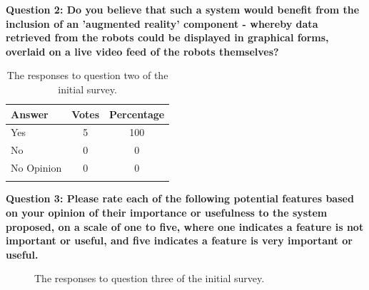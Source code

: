 \clearpage
\noindent\textbf{Question 2: Do you believe that such a system would benefit from the inclusion of an 'augmented reality' component - whereby data retrieved from the robots could be displayed in graphical forms, overlaid on a live video feed of the robots themselves?}

\begin{longtable}{ l c c }
 \textbf{Answer} & \textbf{Votes} & \textbf{Percentage} \\ 
 \hline
 Yes & 5 & 100 \\ 
 No & 0 & 0 \\
 No Opinion & 0 & 0 \\
 \bottomrule
 \caption[Initial Survey Question 2 Responses]{The responses to question two of the initial survey.}
 \label{tab:QuestionTwoData}
\end{longtable}

\noindent\textbf{Question 3: Please rate each of the following potential features based on your opinion of their importance or usefulness to the system proposed, on a scale of one to five, where one indicates a feature is not important or useful, and five indicates a feature is very important or useful.}

\begin{figure}[h]
	\centering
	\decoRule
	\caption[Initial Survey Question 3 Responses]{The responses to question three of the initial survey.}
	\label{fig:FeatureLikert}
\end{figure}


